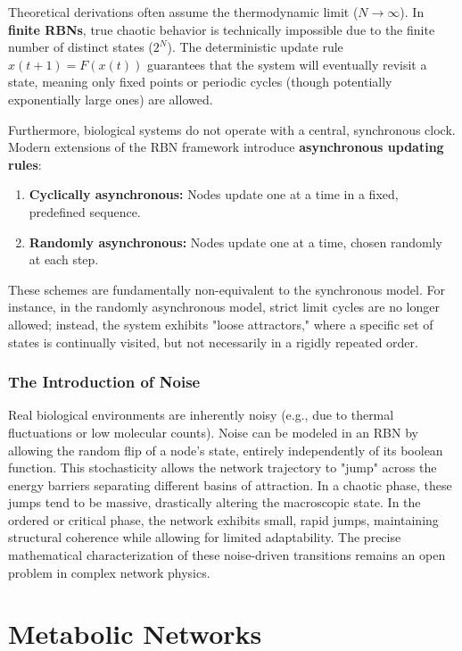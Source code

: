 Theoretical derivations often assume the thermodynamic limit (\(N \to \infty\)). In \textbf{finite RBNs}, true chaotic behavior is technically impossible due to the finite number of distinct states (\(2^N\)). The deterministic update rule \(x(t+1) = F(x(t))\) guarantees that the system will eventually revisit a state, meaning only fixed points or periodic cycles (though potentially exponentially large ones) are allowed.

Furthermore, biological systems do not operate with a central, synchronous clock. Modern extensions of the RBN framework introduce \textbf{asynchronous updating rules}:
\begin{enumerate}
    \item \textbf{Cyclically asynchronous:} Nodes update one at a time in a fixed, predefined sequence.
    \item \textbf{Randomly asynchronous:} Nodes update one at a time, chosen randomly at each step.
\end{enumerate}
These schemes are fundamentally non-equivalent to the synchronous model. For instance, in the randomly asynchronous model, strict limit cycles are no longer allowed; instead, the system exhibits "loose attractors," where a specific set of states is continually visited, but not necessarily in a rigidly repeated order.

\subsubsection{The Introduction of Noise}

Real biological environments are inherently noisy (e.g., due to thermal fluctuations or low molecular counts). Noise can be modeled in an RBN by allowing the random flip of a node's state, entirely independently of its boolean function.
This stochasticity allows the network trajectory to "jump" across the energy barriers separating different basins of attraction. In a chaotic phase, these jumps tend to be massive, drastically altering the macroscopic state. In the ordered or critical phase, the network exhibits small, rapid jumps, maintaining structural coherence while allowing for limited adaptability. The precise mathematical characterization of these noise-driven transitions remains an open problem in complex network physics.

\section{Metabolic Networks}
\label{sec:metabolic_networks}

